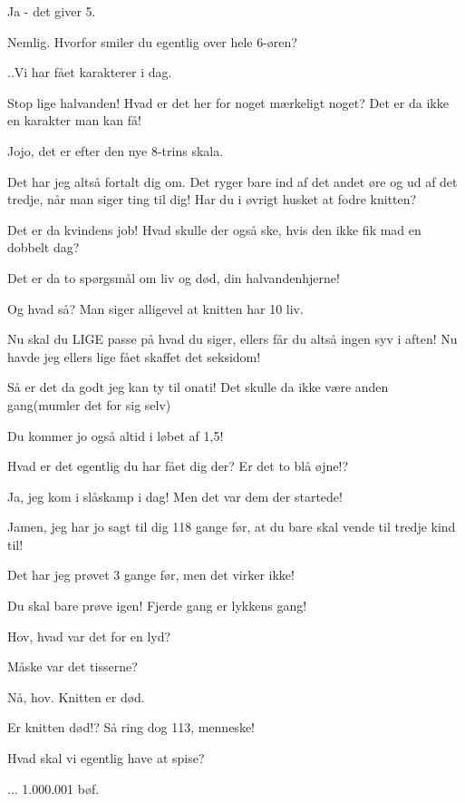 \documentclass[a4paper,11pt]{article}
\begin{document}
\begin{sketch}
 Ja - det giver 5.

 Nemlig. Hvorfor smiler du egentlig over hele 6-øren?

 ..Vi har fået karakterer i dag.


 Stop lige halvanden! Hvad er det her for noget mærkeligt noget? Det er da ikke en karakter man kan få!

 Jojo, det er efter den nye 8-trins skala.

 Det har jeg altså fortalt dig om. Det ryger bare ind af det andet øre og ud af det tredje, når man siger ting til dig! Har du i øvrigt husket at fodre knitten?

 Det er da kvindens job! Hvad skulle der også ske, hvis den ikke fik mad en dobbelt dag?

 Det er da to spørgsmål om liv og død, din halvandenhjerne!

 Og hvad så? Man siger alligevel at knitten har 10 liv.


 Nu skal du LIGE passe på hvad du siger, ellers får du altså ingen syv i aften! Nu havde jeg ellers lige fået skaffet det seksidom!

 Så er det da godt jeg kan ty til onati! Det skulle da ikke være anden gang(mumler det for sig selv)

 Du kommer jo også altid i løbet af 1,5!


 Hvad er det egentlig du har fået dig der? Er det to blå øjne!?

 Ja, jeg kom i slåskamp i dag! Men det var dem der startede!

 Jamen, jeg har jo sagt til dig 118 gange før, at du bare skal vende til tredje kind til!

 Det har jeg prøvet 3 gange før, men det virker ikke!

 Du skal bare prøve igen! Fjerde gang er lykkens gang!


 Hov, hvad var det for en lyd?

 Måske var det tisserne?

 Nå, hov. Knitten er død.

 Er knitten død!? Så ring dog 113, menneske!


 Hvad skal vi egentlig have at spise?

 ... 1.000.001 bøf.

\end{sketch}
\end{document}
